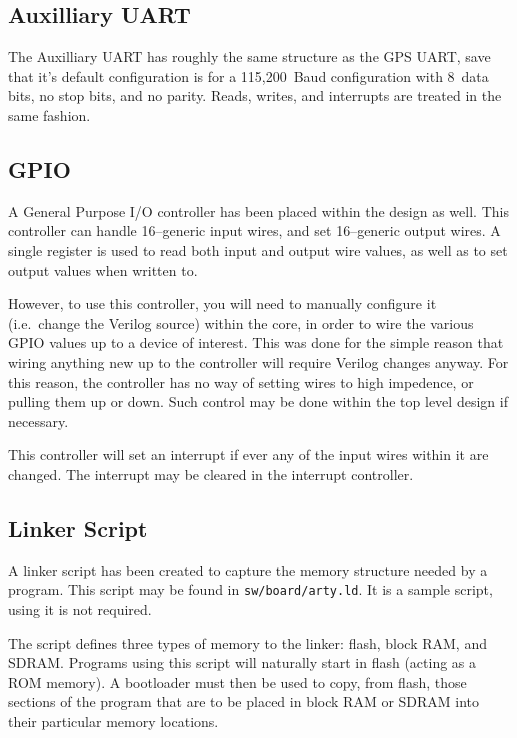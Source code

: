 \documentclass{gqtekspec}
\begin{document}
\subsection{Auxilliary UART}

The Auxilliary UART has roughly the same structure as the GPS UART, save that
it's default configuration is for a 115,200~Baud configuration with 8~data bits,
no stop bits, and no parity.  Reads, writes, and interrupts are treated in
the same fashion.

\subsection{GPIO}

A General Purpose I/O controller has been placed within the design as well.
This controller can handle 16--generic input wires, and set 16--generic output
wires.  A single register is used to read both input and output wire values,
as well as to set output values when written to. 

However, to use this controller, you will need to manually configure it
(i.e.~change the Verilog source) within the core, in order to wire the various
GPIO values up to a device of interest.  This was done for the simple reason
that wiring anything new up to the controller will require Verilog changes
anyway.  For this reason, the controller has no way of setting wires to high
impedence, or pulling them up or down.  Such control may be done within the
top level design if necessary.

This controller will set an interrupt if ever any of the input wires within
it are changed.  The interrupt may be cleared in the interrupt controller.

\subsection{Linker Script}

A linker script has been created to capture the memory structure needed by
a program.  This script may be found in {\tt sw/board/arty.ld}.  It is a
sample script, using it is not required.

The script defines three types of memory to the linker: flash, block RAM, and
SDRAM.  Programs using this script will naturally start in flash (acting as
a ROM memory).  A bootloader must then be used to copy, from flash, those
sections of the program that are to be placed in block RAM or SDRAM into
their particular memory locations.
\end{document}
